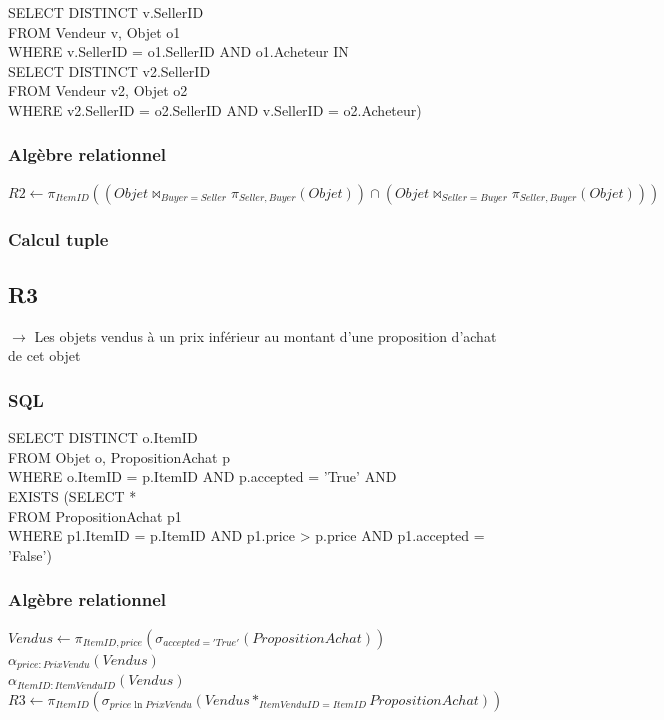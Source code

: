 \documentclass[a4paper,11pt]{article}
\begin{document}
SELECT DISTINCT v.SellerID\\
FROM Vendeur v, Objet o1\\
WHERE v.SellerID = o1.SellerID AND o1.Acheteur IN\\
\indent \indent SELECT DISTINCT v2.SellerID\\
\indent \indent FROM Vendeur v2, Objet o2\\
\indent \indent WHERE v2.SellerID = o2.SellerID AND v.SellerID = o2.Acheteur)
    
\subsubsection{Algèbre relationnel}
$R2 \leftarrow \pi_{ItemID}((Objet \bowtie_{Buyer=Seller} \pi_{Seller,Buyer}(Objet)) 
			    \cap (Objet \bowtie_{Seller=Buyer} \pi_{Seller,Buyer}(Objet)))$

			    
\subsubsection{Calcul tuple}

\subsection{R3}

$\rightarrow$ Les objets vendus à un prix inférieur au montant d'une proposition d'achat de cet objet

\subsubsection{SQL}

SELECT DISTINCT o.ItemID\\
FROM Objet o, PropositionAchat p\\
WHERE o.ItemID = p.ItemID AND p.accepted = 'True' AND\\
\indent \indent EXISTS (SELECT *\\
\indent \indent FROM PropositionAchat p1\\
\indent \indent WHERE p1.ItemID = p.ItemID AND p1.price > p.price AND p1.accepted = 'False')
        
\subsubsection{Algèbre relationnel}

$Vendus \leftarrow \pi_{ItemID, price}(\sigma_{accepted='True'}(PropositionAchat))$\\
$\alpha_{price:PrixVendu}(Vendus)$\\
$\alpha_{ItemID:ItemVenduID}(Vendus)$\\
$R3 \leftarrow \pi_{ItemID}(\sigma_{price \ln PrixVendu}(Vendus*_{ItemVenduID=ItemID}PropositionAchat)) $
\end{document}
